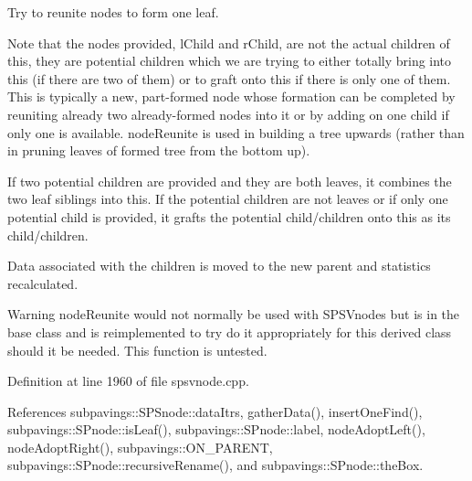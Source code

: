 \-Try to reunite nodes to form one leaf. 

\-Note that the nodes provided, l\-Child and r\-Child, are not the actual children of this, they are potential children which we are trying to either totally bring into this (if there are two of them) or to graft onto this if there is only one of them. \-This is typically a new, part-\/formed node whose formation can be completed by reuniting already two already-\/formed nodes into it or by adding on one child if only one is available. node\-Reunite is used in building a tree upwards (rather than in pruning leaves of formed tree from the bottom up).

\-If two potential children are provided and they are both leaves, it combines the two leaf siblings into this. \-If the potential children are not leaves or if only one potential child is provided, it grafts the potential child/children onto this as its child/children.

\-Data associated with the children is moved to the new parent and statistics recalculated.

\begin{DoxyWarning}{\-Warning}
node\-Reunite would not normally be used with \-S\-P\-S\-Vnodes but is in the base class and is reimplemented to try do it appropriately for this derived class should it be needed. \-This function is untested. 
\end{DoxyWarning}


\-Definition at line 1960 of file spsvnode.\-cpp.



\-References subpavings\-::\-S\-P\-Snode\-::data\-Itrs, gather\-Data(), insert\-One\-Find(), subpavings\-::\-S\-Pnode\-::is\-Leaf(), subpavings\-::\-S\-Pnode\-::label, node\-Adopt\-Left(), node\-Adopt\-Right(), subpavings\-::\-O\-N\-\_\-\-P\-A\-R\-E\-N\-T, subpavings\-::\-S\-Pnode\-::recursive\-Rename(), and subpavings\-::\-S\-Pnode\-::the\-Box.


